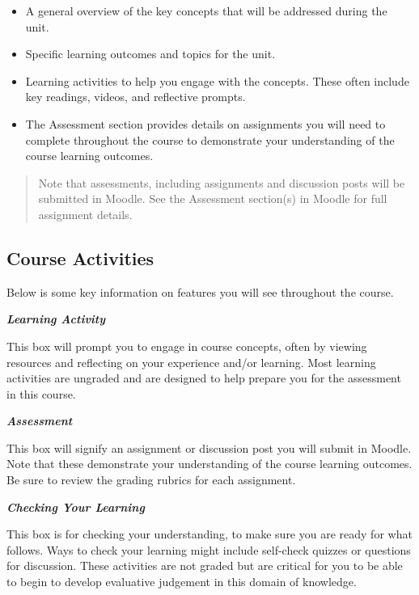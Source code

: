 \documentclass[
]{book}
\providecommand{\tightlist}{%
  \setlength{\itemsep}{0pt}\setlength{\parskip}{0pt}}
\begin{document}
\begin{itemize}
\tightlist
\item
  A general overview of the key concepts that will be addressed during the unit.\\
\item
  Specific learning outcomes and topics for the unit.\\
\item
  Learning activities to help you engage with the concepts. These often include key readings, videos, and reflective prompts.\\
\item
  The Assessment section provides details on assignments you will need to complete throughout the course to demonstrate your understanding of the course learning outcomes.
\end{itemize}

\begin{quote}
Note that assessments, including assignments and discussion posts will be submitted in Moodle. See the Assessment section(s) in Moodle for full assignment details.
\end{quote}

\hypertarget{course-activities}{%
\subsection*{Course Activities}\label{course-activities}}

Below is some key information on features you will see throughout the course.

\begin{reflect}
\textbf{\emph{Learning Activity}}

This box will prompt you to engage in course concepts, often by viewing resources and reflecting on your experience and/or learning. Most learning activities are ungraded and are designed to help prepare you for the assessment in this course.
\end{reflect}

\begin{assessment}
\textbf{\emph{Assessment}}

This box will signify an assignment or discussion post you will submit in Moodle. Note that these demonstrate your understanding of the course learning outcomes. Be sure to review the grading rubrics for each assignment.
\end{assessment}

\begin{progress}
\textbf{\emph{Checking Your Learning}}

This box is for checking your understanding, to make sure you are ready for what follows. Ways to check your learning might include self-check quizzes or questions for discussion. These activities are not graded but are critical for you to be able to begin to develop evaluative judgement in this domain of knowledge.
\end{progress}
\end{document}

